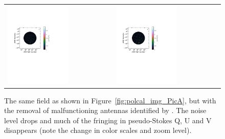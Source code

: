 \begin{figure}
\begin{tabular}{ll}
\includegraphics[clip, trim=0.1cm 11cm 6cm 6cm, width=0.6\textwidth]{chapters/polcal/figures/68380-U-improved.pdf} &
\includegraphics[clip, trim=0.1cm 11cm 6cm 6cm, width=0.6\textwidth]{chapters/polcal/figures/68380-V-improved.pdf} \\
\end{tabular}
\caption[The same field as shown in Figure~\ref{fig:polcal_img_PicA}, but with the removal of malfunctioning antennas identified by \cite{Kohn.16}.]{The same field as shown in Figure~\ref{fig:polcal_img_PicA}, but with the removal of malfunctioning antennas identified by \cite{Kohn.16}. The noise level drops and much of the fringing in pseudo-Stokes Q, U and V disappears (note the change in color scales and zoom level).}
\label{fig:polcal_img_PicA_improved}
\end{figure}

